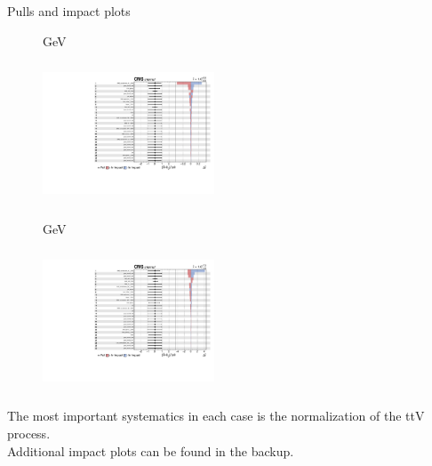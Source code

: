 \documentclass[8pt]{beamer}
\begin{document}
\begin{frame}{Pulls and impact plots}
\justifying
\begin{figure}[htbp]
\centering
\begin{block}{}\end{block}	\vspace{-8pt}

\begin{minipage}[b]{0.49\textwidth}
\begin{center}
\centering \begin{block}{ GeV}\end{block}	
\includegraphics[width=5.1cm, height=4.2cm]{figs/2016/impacts_2016_both_scalar_100.pdf}
\end{center}
\end{minipage}\hfill
\begin{minipage}[b]{0.49\textwidth}
\begin{center}
\centering \begin{block}{ GeV}\end{block}	
\includegraphics[width=5.1cm, height=4.2cm]{figs/2016/impacts_2016_both_scalar_500.pdf}
\end{center}
\end{minipage} \hfill
\end{figure}

The most important systematics in each case is the normalization of the ttV process. \\
Additional impact plots can be found in the backup. \vfill
\end{frame}
\end{document}

